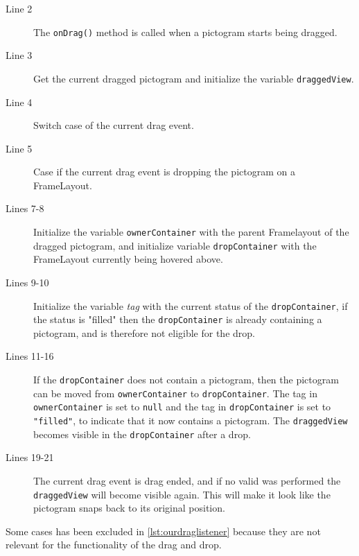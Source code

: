 \begin{description}
\item[Line 2] The \lstinline|onDrag()| method is called when a pictogram starts being dragged.
\item[Line 3] Get the current dragged pictogram and initialize the variable \lstinline|draggedView|.
\item[Line 4] Switch case of the current drag event.
\item[Line 5] Case if the current drag event is dropping the pictogram on a FrameLayout.
\item[Lines 7-8] Initialize the variable \lstinline|ownerContainer| with the parent Framelayout of the dragged pictogram, and initialize variable \lstinline|dropContainer| with the FrameLayout currently being hovered above.  
\item[Lines 9-10] Initialize the variable \textit{tag} with the current status of the \lstinline|dropContainer|, if the status is "filled" then the \lstinline|dropContainer| is already containing a pictogram, and is therefore not eligible for the drop.
\item[Lines 11-16] If the \lstinline|dropContainer| does not contain a pictogram, then the pictogram can be moved from \lstinline|ownerContainer| to \lstinline|dropContainer|. The tag in \lstinline|ownerContainer| is set to \lstinline|null| and the tag in \lstinline|dropContainer| is set to \lstinline|"filled"|, to indicate that it now contains a pictogram. The \lstinline|draggedView| becomes visible in the \lstinline|dropContainer| after a drop.
\item[Lines 19-21] The current drag event is drag ended, and if no valid was performed the \lstinline|draggedView| will become visible again. This will make it look like the pictogram snaps back to its original position.
\end{description}
Some cases has been excluded in \autoref{lst:ourdraglistener} because they are not relevant for the functionality of the drag and drop.

